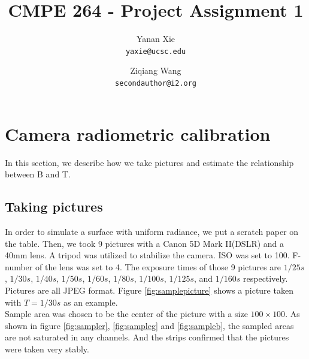 \documentclass[10pt,twocolumn,letterpaper]{article}
\begin{document}
\title{CMPE 264 - Project Assignment 1}

\author{Yanan Xie\\
{\tt\small yaxie@ucsc.edu}
\and
Ziqiang Wang\\
{\tt\small secondauthor@i2.org}
}

\maketitle


\section{Camera radiometric calibration}

In this section, we describe how we take pictures and estimate the relationship between B and T.

\subsection{Taking pictures}

In order to simulate a surface with uniform radiance, we put a scratch paper on the table. Then, we took 9 pictures with a Canon 5D Mark II(DSLR) and a 40mm lens. A tripod was utilized to stabilize the camera. ISO was set to 100. F-number of the lens was set to 4. The exposure times of those 9 pictures are $1/25s$, $1/30s$, $1/40s$, $1/50s$, $1/60s$, $1/80s$, $1/100s$, $1/125s$, and $1/160s$ respectively. Pictures are all JPEG format. Figure \ref{fig:samplepicture} shows a picture taken with $T = 1/30s$ as an example. \\

Sample area was chosen to be the center of the picture with a size $100\times 100$. As shown in figure \ref{fig:sampler}, \ref{fig:sampleg} and \ref{fig:sampleb}, the sampled areas are not saturated in any channels. And the strips confirmed that the pictures were taken very stably.
\end{document}
